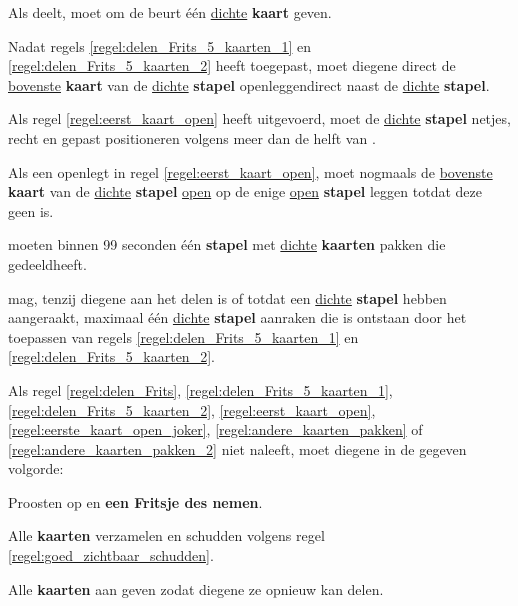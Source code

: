\vervolgLijst{}
\item Als \Frits deelt\footnotemark[1], moet \Frits \alleSpelers om de beurt één \ul{dichte} \textbf{kaart} geven.
\label{regel:delen_Frits_5_kaarten_2}
\eindLijst{}

\vervolgLijst{}
\item Nadat \Frits regels \ref{regel:delen_Frits_5_kaarten_1} en \ref{regel:delen_Frits_5_kaarten_2} heeft toegepast, moet diegene direct de \ul{bovenste} \textbf{kaart} van de \ul{dichte} \textbf{stapel} openleggen\footnotemark[2] direct naast de \ul{dichte} \textbf{stapel}.
\label{regel:eerst_kaart_open}
\eindLijst{}

\vervolgLijst{}
\item Als \Frits regel \ref{regel:eerst_kaart_open} heeft uitgevoerd, moet \Frits de \ul{dichte} \textbf{stapel} netjes, recht en gepast positioneren volgens meer dan de helft van \alleSpelersN.
\label{regel:dichte_stapel_recht_na_eerste_keer_opleggen}
\eindLijst{}


\vervolgLijst{}
\item Als \Frits een \footnotemark[3] openlegt in regel \ref{regel:eerst_kaart_open}, moet \Frits nogmaals de \ul{bovenste} \textbf{kaart} van de \ul{dichte} \textbf{stapel} \ul{open} op de enige \ul{open} \textbf{stapel} leggen totdat deze geen \footnotemark[3] is.
\label{regel:eerste_kaart_open_joker}
\eindLijst{}


\vervolgLijst{}
\item \AlleSpelers moeten binnen 99 seconden \'e\'en \textbf{stapel} met \ul{dichte} \textbf{kaarten} pakken die \Frits gedeeld\footnotemark[1] heeft.
\label{regel:andere_kaarten_pakken}
\eindLijst{}

\vervolgLijst{}
\item \EenSpeler mag, tenzij diegene aan het delen is of totdat \alleSpelers een \ul{dichte} \textbf{stapel} hebben aangeraakt, maximaal \'e\'en \ul{dichte} \textbf{stapel} aanraken die is ontstaan door het toepassen van regels \ref{regel:delen_Frits_5_kaarten_1} en \ref{regel:delen_Frits_5_kaarten_2}.
\label{regel:andere_kaarten_pakken_2}
\eindLijst{}

\vervolgLijst{}
\item Als \eenSpeler regel \ref{regel:delen_Frits}, \ref{regel:delen_Frits_5_kaarten_1}, \ref{regel:delen_Frits_5_kaarten_2}, \ref{regel:eerst_kaart_open}, \ref{regel:eerste_kaart_open_joker}, \ref{regel:andere_kaarten_pakken} of \ref{regel:andere_kaarten_pakken_2} niet naleeft, moet diegene in de gegeven volgorde:
\puntLijst{}
\item Proosten op  en \textbf{een Fritsje des nemen}\footnotemark[4].
\item Alle \textbf{kaarten} verzamelen en schudden volgens regel \ref{regel:goed_zichtbaar_schudden}.
\item Alle \textbf{kaarten} aan \Frits geven zodat diegene ze opnieuw kan delen.
\eindPuntLijst{}
\eindLijst{}

